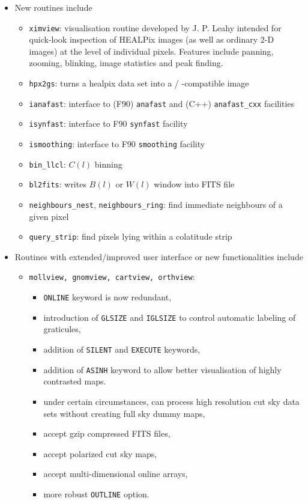 \documentclass[12pt,twoside]{article}
\begin{document}
{{\begin{itemize}
\item New routines include
\begin{itemize}
 \item {{\tt ximview}}: visualisation routine developed by J. P. Leahy intended for quick-look inspection of HEALPix images 
(as well as ordinary 2-D images) at the level of individual pixels. Features
include panning, zooming, blinking, image statistics and peak finding.
 \item {{\tt hpx2gs}}: turns a healpix data set into a
%
/%
%
-compatible image
 \item {{\tt ianafast}}: interface to (F90) {\tt anafast} and (C++) {\tt anafast\_cxx} facilities 
 \item {{\tt isynfast}}: interface to F90 {\tt synfast} facility
 \item {{\tt ismoothing}}: interface to F90 {\tt smoothing} facility
 \item {{\tt bin\_llcl}}: $C(l)$ binning
 \item {{\tt bl2fits}}: writes $B(l)$ or $W(l)$ window into
FITS file
 \item {{\tt neighbours\_nest}}, %
       {{\tt neighbours\_ring}}: %
   find immediate neighbours of a given pixel
 \item {{\tt query\_strip}}: %
   find pixels lying within a colatitude strip
\end{itemize}
%
\item Routines with extended/improved user interface or new functionalities include
\begin{itemize}
\item {{\tt mollview, gnomview, cartview, orthview}}: 
\begin{itemize}
\item {\tt ONLINE} keyword is now redundant, 
\item introduction of {\tt GLSIZE} and {\tt IGLSIZE} to
control automatic labeling of graticules,
\item addition of {\tt SILENT} and {\tt EXECUTE} keywords,
\item addition of {\tt ASINH} keyword to allow better visualisation of highly
contrasted maps.
\item under certain circumstances, can process high resolution cut sky data sets
without creating full sky dummy maps,
\item accept gzip compressed FITS files,
\item accept polarized cut sky maps,
\item accept multi-dimensional online arrays,
\item more robust {\tt OUTLINE} option.
\end{itemize}


\end{itemize}
\end{itemize}}}
\end{document}
